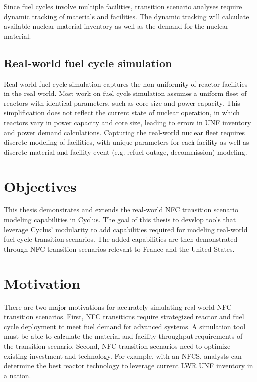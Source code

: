 Since fuel cycles involve multiple facilities,
transition scenario analyses require
dynamic tracking of materials and facilities.
The dynamic tracking will calculate available nuclear material
inventory as well as the demand for the nuclear
material.

\subsection{Real-world fuel cycle simulation}
Real-world fuel cycle simulation captures the non-uniformity of
reactor facilities in the real world. Most work on fuel cycle
simulation assumes a uniform fleet of reactors with identical
parameters, such as core size and power capacity. This simplification
does not reflect the current state of nuclear operation, in which
reactors vary in power capacity and core size, leading
to errors in \gls{UNF} inventory and power demand calculations.
Capturing the real-world nuclear fleet requires discrete
modeling of facilities, with unique parameters for each facility
as well as discrete material and facility event (e.g. refuel outage,
decommission) modeling.


\section{Objectives}

This thesis demonstrates and extends the real-world \gls{NFC} transition
scenario modeling capabilities in Cyclus. 
The goal of this thesis to
develop tools that leverage Cyclus' modularity to
add capabilities required for modeling real-world
fuel cycle transition scenarios. The added capabilities are then
demonstrated through \gls{NFC} transition scenarios relevant to France and the United
States.

\section{Motivation}

There are two major motivations for accurately simulating
real-world \gls{NFC} transition scenarios.
First, \gls{NFC} transitions require strategized reactor
and fuel cycle deployment to meet fuel demand for advanced systems.
A simulation tool must be able to calculate the material
and facility throughput requirements of the transition scenario.
Second, \gls{NFC} transition scenarios need to optimize
existing investment and technology. For example, with an \gls{NFCS},
analysts can determine the best reactor technology
to leverage current \gls{LWR} \gls{UNF} inventory in a nation.



